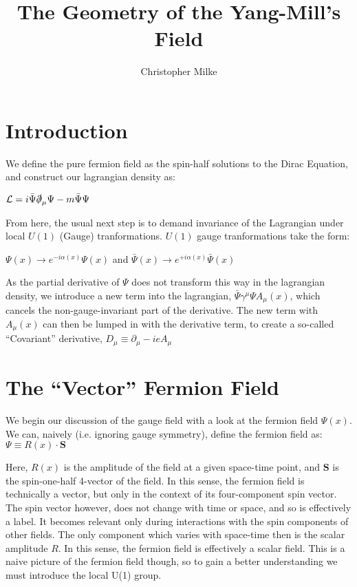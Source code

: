 \documentclass{article}
\begin{document}
\title{The Geometry of the Yang-Mill's Field}
\author{Christopher Milke}

\maketitle

\section{Introduction}
        We define the pure fermion field as the spin-half solutions to the Dirac Equation, and construct our lagrangian density as:

        $ \mathcal{L} =  i \bar{\Psi} \slashed\partial_\mu \Psi - m \bar{\Psi} \Psi   $

        From here, the usual next step is to demand invariance of the Lagrangian under local $U(1)$ (Gauge) tranformations. $U(1)$ gauge tranformations take the form: 

        $ \Psi(x) \rightarrow e^{-i \alpha(x)} \Psi(x) $ and $ \bar\Psi(x) \rightarrow e^{+i \alpha(x)} \bar\Psi(x) $

        As the partial derivative of $\Psi$ does not transform this way in the lagrangian density, we introduce a new term into the lagrangian, 
        $  \bar{\Psi} \gamma^\mu \Psi A_\mu(x) $, which cancels the non-gauge-invariant part of the derivative. The new term with $A_\mu(x)$ can then be lumped in with the derivative term, to create a so-called ``Covariant'' derivative,
        $ D_\mu \equiv \partial_\mu - i e A_\mu $


\section{The ``Vector'' Fermion Field}
        We begin our discussion of the gauge field with a look at the fermion field $\Psi(x)$. We can, naively (i.e. ignoring gauge symmetry), define the fermion field as: 
        $\Psi \equiv R(x) \cdot \mathbf{S}$

        Here, $R(x)$ is the amplitude of the field at a given space-time point, and $\mathbf{S}$ is the spin-one-half 4-vector of the field.
        In this sense, the fermion field is technically a vector, but only in the context of its four-component spin vector. The spin vector however, does not change with time or space, and so is effectively a label. It becomes relevant only during interactions with the spin components of other fields. The only component which varies with space-time then is the scalar amplitude $R$. In this sense, the fermion field is effectively a scalar field. This is a naive picture of the fermion field though, so to gain a better understanding we must introduce the local U(1) group.
        
\end{document}
